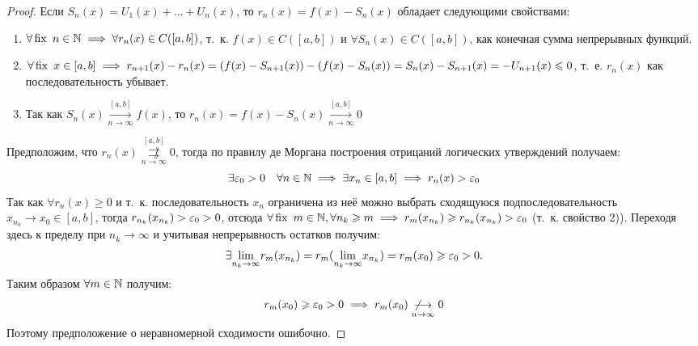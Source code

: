 \documentclass[../../main.tex]{subfiles}
\begin{document}
\begin{proof}
Если $S_n(x) = U_1(x) + \ldots + U_n(x)$, то $r_n(x) = f(x) - S_n(x)$ обладает
следующими свойствами:
	\begin{enumerate}
		\item $\forall \operatorname{fix} \ n \in \mathbb{N} \implies 
	\forall r_n(x) \in C([a,b])$, т.~к. $f(x) \in C([a,b])$ и
	$\forall S_n(x) \in C([a,b])$, как конечная сумма непрерывных функций.
		\item $\forall \operatorname{fix} \ x \in [a,b] \implies 
	r_{n+1}(x) - r_n(x) = (f(x) - S_{n+1}(x)) - (f(x) - S_n(x)) = 
	S_n(x) - S_{n+1}(x)= -U_{n+1}(x) \leqslant 0$, т.~е.
	$r_n(x)$ как последовательность убывает.
		\item Так как $S_n(x) \overset{[a,b]}
	{\underset{n \to \infty}\longrightarrow} f(x)$, то 
	$r_n(x) = f(x) - S_n(x) \overset{[a,b]}
	{\underset{n \to \infty}\longrightarrow} 0$
	\end{enumerate}
Предположим, что $r_n(x) \overset{[a,b]}
{\underset{n \to \infty}{\not \rightrightarrows}} 0$, тогда по правилу
де Моргана построения отрицаний логических утверждений получаем: 
\[
\exists \varepsilon_0 > 0 \quad \forall n \in \mathbb{N} \implies 
\exists x_n \in [a,b] \implies r_n(x) > \varepsilon_0
\]
Так как $\forall r_n(x) \geq 0$ и т.~к. последовательность $x_n$ ограничена
из неё можно выбрать сходящуюся подпоследовательность 
$x_{n_k} \to x_0 \in [a,b]$, тогда $r_{n_k}(x_{n_k}) > \varepsilon_0 > 0$, отсюда
$\forall \operatorname{fix} \ m \in \mathbb{N}, \forall n_k \geqslant m \implies r_m(x_{n_k}) \geqslant
r_{n_k}(x_{n_k}) > \varepsilon_0$ (т.~к. свойство 2)). Переходя здесь к пределу при 
$n_k \to \infty$ и учитывая непрерывность остатков получим:
\[
\exists \underset{n_k \to \infty}{\lim} r_m(x_{n_k}) = 
r_m(\underset{n_k \to \infty}{\lim}x_{n_k}) = r_m(x_0) \geqslant
\varepsilon_0 > 0.
\]
Таким образом $\forall m \in \mathbb{N}$ получим: 
\[
r_m(x_0) \geqslant \varepsilon_0 > 0 \implies
r_m(x_0) \underset{n \to \infty}{\not \longrightarrow} 0
\]
Поэтому предположение о неравномерной сходимости ошибочно.
\end{proof}
\end{document}
